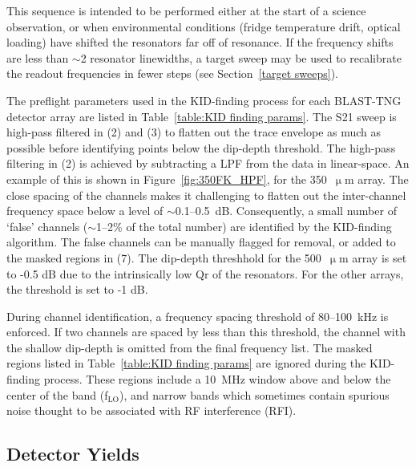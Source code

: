 This sequence is intended to be performed either at the start of a science observation, or when environmental conditions (fridge temperature drift, optical loading) have shifted the resonators far off of resonance. If the frequency shifts are less than $\sim$2 resonator linewidths, a target sweep may be used to recalibrate the readout frequencies in fewer steps (see Section~\ref{target sweeps}).

The preflight parameters used in the KID-finding process for each BLAST-TNG detector array are listed in Table~\ref{table:KID finding params}. The \gls{S21} sweep is high-pass filtered in (2) and (3) to flatten out the trace envelope as much as possible before identifying points below the dip-depth threshold. The high-pass filtering in (2) is achieved by subtracting a LPF from the data in linear-space. An example of this is shown in Figure~\ref{fig:350FK_HPF}, for the 350~$\upmu$m array. The close spacing of the channels makes it challenging to flatten out the inter-channel frequency space below a level of $\sim$0.1--0.5~dB. Consequently, a small number of `false' channels ($\sim$1--2\% of the total number) are identified by the KID-finding algorithm. The false channels can be manually flagged for removal, or added to the masked regions in (7). The dip-depth threshhold for the 500~$\upmu$m array is set to -0.5 dB due to the intrinsically low \gls{Qr} of the resonators. For the other arrays, the threshold is set to -1 dB.

During channel identification, a frequency spacing threshold of 80--100~kHz is enforced. If two channels are spaced by less than this threshold, the channel with the shallow dip-depth is omitted from the final frequency list. The masked regions listed in Table~\ref{table:KID finding params} are ignored during the KID-finding process. These regions include a 10~MHz window above and below the center of the band (f$_\mathrm{LO}$), and narrow bands which sometimes contain spurious noise thought to be associated with RF interference (RFI).

\subsection{Detector Yields}\label{yields}

